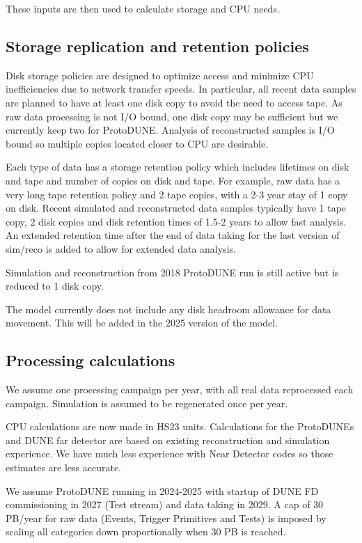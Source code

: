 \documentclass[12pt]{article}
\begin{document}
     

  These inputs are then used to calculate storage and CPU needs. 

\subsection{Storage replication and retention policies}
Disk storage policies are designed to optimize access and minimize CPU inefficiencies due to network transfer speeds.  In particular, all recent data samples are planned to have at least one disk copy to avoid the need to access tape.  As raw data processing is not I/O bound, one disk copy may be sufficient but we currently keep two for ProtoDUNE. Analysis of reconstructed samples is I/O bound so multiple copies located closer to CPU are desirable. 

Each type of data has a storage retention policy which includes lifetimes on disk and tape and number of copies on disk and tape.  For example, raw data has a very long tape retention policy and 2 tape copies, with a 2-3 year stay of 1 copy on disk.   Recent simulated and reconstructed data samples typically have 1 tape copy, 2 disk copies and disk retention times of 1.5-2 years to allow fast analysis.   An extended retention time after the end of data taking for the last version of sim/reco is added to allow for extended data analysis. 

Simulation and reconstruction from 2018 ProtoDUNE run is still active but is reduced to 1 disk copy. 

The model currently does not include any disk headroom allowance for data movement.  This will be added in the 2025 version of the model. 

\subsection{Processing calculations}

 We assume one processing campaign per year, with all real data reprocessed each campaign.   Simulation is assumed to be regenerated  once per year.
   
CPU calculations are now made in HS23 units.  Calculations for the ProtoDUNEs and DUNE far detector are based on existing reconstruction and simulation experience.  We have much less experience with Near Detector codes so those estimates are less accurate.

We assume ProtoDUNE running in 2024-2025 with startup of DUNE FD commissioning in 2027 (Test stream) and data taking in 2029. A cap of 30 PB/year for raw data (Events, Trigger Primitives and Tests) is imposed by scaling all categories down proportionally when 30 PB is reached. 
\end{document}
